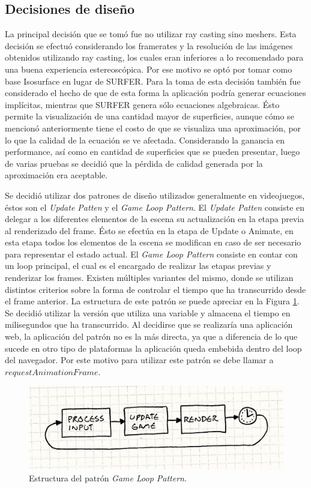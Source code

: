 \documentclass[12pt]{article}
\begin{document}
\subsection{Decisiones de diseño}
La principal decisión que se tomó fue no utilizar ray casting sino meshers. Esta decisión se efectuó considerando los framerates y la resolución de las imágenes obtenidos utilizando ray casting, los cuales eran inferiores a lo recomendado para una buena experiencia estereoscópica. Por ese motivo se optó por tomar como base Isosurface en lugar de SURFER. Para la toma de esta decisión también fue considerado el hecho de que de esta forma la aplicación podría generar ecuaciones implícitas, mientras que SURFER genera sólo ecuaciones algebraicas. Ésto permite la visualización de una cantidad mayor de superficies, aunque cómo se mencionó anteriormente tiene el costo de que se visualiza una aproximación, por lo que la calidad de la ecuación se ve afectada. Considerando la ganancia en performance, así como en cantidad de superficies que se pueden presentar, luego de varias pruebas se decidió que la pérdida de calidad generada por la aproximación era aceptable.

Se decidió utilizar dos patrones de diseño utilizados generalmente en videojuegos, éstos son el \textit{Update Patten} y el \textit{Game Loop Pattern}\cite{patterns}\cite{engine}. El \textit{Update Patten} consiste en delegar a los diferentes elementos de la escena su actualización en la etapa previa al renderizado del frame. Ésto se efectúa en la etapa de Update o Animate, en esta etapa todos los elementos de la escena se modifican en caso de ser necesario para representar el estado actual. El \textit{Game Loop Pattern} consiste en contar con un loop principal, el cual es el encargado de realizar las etapas previas y renderizar los frames. Existen múltiples variantes del mismo\cite{patterns}, donde se utilizan distintos criterios sobre la forma de controlar el tiempo que ha transcurrido desde el frame anterior. La estructura de este patrón se puede apreciar en la Figura \ref{glp}. Se decidió utilizar la versión que utiliza una variable y almacena el tiempo en milisegundos que ha transcurrido. Al decidirse que se realizaría una aplicación web, la aplicación del patrón no es la más directa, ya que a diferencia de lo que sucede en otro tipo de plataformas la aplicación queda embebida dentro del loop del navegador. Por este motivo para utilizar este patrón se debe llamar a $requestAnimationFrame$\cite{patterns}.
\begin{figure}[h]
\includegraphics[width =0.7\linewidth, center]{gameloop.png}
\caption{Estructura del patrón \textit{Game Loop Pattern}\cite{patterns}.}
\label{glp}
\end{figure}
\end{document}
